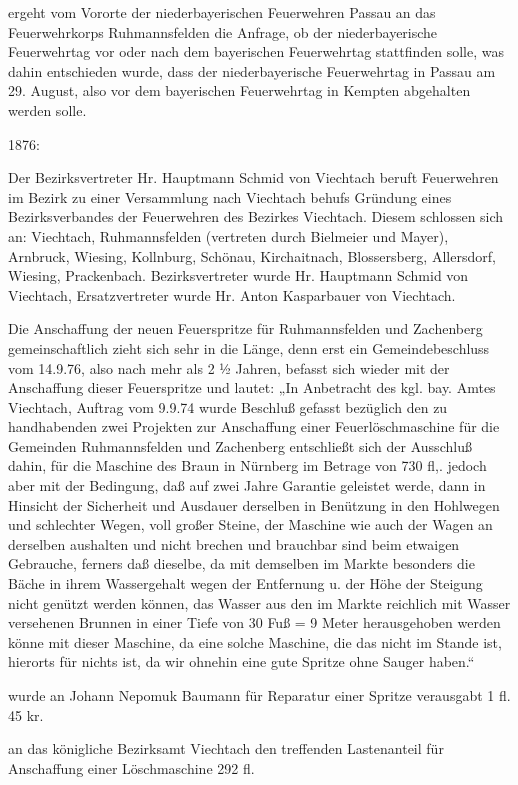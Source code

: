 \documentclass{book}
\begin{document}
ergeht vom Vororte der niederbayerischen Feuerwehren Passau an das
Feuerwehrkorps Ruhmannsfelden die Anfrage, ob der niederbayerische Feuerwehrtag
vor oder nach dem bayerischen Feuerwehrtag stattfinden solle, was dahin
entschieden wurde, dass der niederbayerische Feuerwehrtag in Passau am 29.
August, also vor dem bayerischen Feuerwehrtag in Kempten abgehalten werden
solle.

1876:

Der Bezirksvertreter Hr. Hauptmann Schmid von Viechtach beruft Feuerwehren im
Bezirk zu einer Versammlung nach Viechtach behufs Gründung eines
Bezirksverbandes der Feuerwehren des Bezirkes Viechtach. Diesem schlossen sich
an: Viechtach, Ruhmannsfelden (vertreten durch Bielmeier und Mayer), Arnbruck,
Wiesing, Kollnburg, Schönau, Kirchaitnach, Blossersberg, Allersdorf, Wiesing,
Prackenbach. Bezirksvertreter wurde Hr. Hauptmann Schmid von Viechtach,
Ersatzvertreter wurde Hr. Anton Kasparbauer von Viechtach.

Die Anschaffung der neuen Feuerspritze für Ruhmannsfelden und Zachenberg
gemeinschaftlich zieht sich sehr in die Länge, denn erst ein Gemeindebeschluss
vom 14.9.76, also nach mehr als 2 ½ Jahren, befasst sich wieder mit der
Anschaffung dieser Feuerspritze und lautet: „In Anbetracht des kgl. bay. Amtes
Viechtach, Auftrag vom 9.9.74 wurde Beschluß gefasst bezüglich den zu
handhabenden zwei Projekten zur Anschaffung einer Feuerlöschmaschine für die
Gemeinden Ruhmannsfelden und Zachenberg entschließt sich der Ausschluß dahin,
für die Maschine des Braun in Nürnberg im Betrage von 730 fl,. jedoch aber mit
der Bedingung, daß auf zwei Jahre Garantie geleistet werde, dann in Hinsicht der
Sicherheit und Ausdauer derselben in Benützung in den Hohlwegen und schlechter
Wegen, voll großer Steine, der Maschine wie auch der Wagen an derselben
aushalten und nicht brechen und brauchbar sind beim etwaigen Gebrauche, ferners
daß dieselbe, da mit demselben im Markte besonders die Bäche in ihrem
Wassergehalt wegen der Entfernung u. der Höhe der Steigung nicht genützt werden
können, das Wasser aus den im Markte reichlich mit Wasser versehenen Brunnen in
einer Tiefe von 30 Fuß = 9 Meter herausgehoben werden könne mit dieser Maschine,
da eine solche Maschine, die das nicht im Stande ist, hierorts für nichts ist,
da wir ohnehin eine gute Spritze ohne Sauger haben.“

wurde an Johann Nepomuk Baumann für Reparatur einer Spritze verausgabt 1 fl. 45
kr.

an das königliche Bezirksamt Viechtach den treffenden Lastenanteil für
Anschaffung einer Löschmaschine 292 fl.
\end{document}
